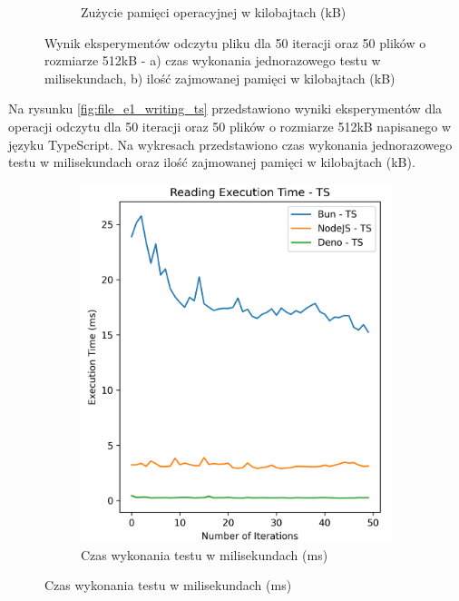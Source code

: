 \begin{figure}[H]
\begin{subfigure}[b]{0.42\textwidth}
    \caption{Zużycie pamięci operacyjnej w kilobajtach (kB)}
    \label{fig:file_e1_reading_ts_memory}
  \end{subfigure}
  \caption{Wynik eksperymentów odczytu pliku dla 50 iteracji oraz 50 plików o rozmiarze 512kB - a) czas wykonania jednorazowego testu w milisekundach, b) ilość zajmowanej pamięci w kilobajtach (kB)}
  \label{fig:file_e1_reading_ts}
\end{figure}

Na rysunku \ref{fig:file_e1_writing_ts} przedstawiono wyniki eksperymentów dla operacji odczytu dla 50 iteracji oraz 50 plików o rozmiarze 512kB napisanego w języku TypeScript. Na wykresach przedstawiono czas wykonania jednorazowego testu w milisekundach oraz ilość zajmowanej pamięci w kilobajtach (kB).

\begin{figure}[H]
  \centering
  \begin{subfigure}[b]{0.42\textwidth}
    \centering
    \includegraphics[width=\textwidth]{Figures/files/files_writing_50_500_50_ts_time.png}
    \caption{Czas wykonania testu w milisekundach (ms)}
    \label{fig:file_e1_writing_ts_time}
  \end{subfigure}

\end{figure}
